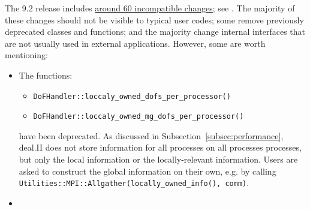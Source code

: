 \documentclass{ansarticle-preprint}
\begin{document}
The 9.2 release includes
\href{https://dealii.org/developer/doxygen/deal.II/changes_between_9_1_1_and_9_2_0.html}
     {around 60 incompatible changes}; see \cite{changes92}. The majority of these changes
should not be visible to typical user codes; some remove previously
deprecated classes and functions; and the majority change internal
interfaces that are not usually used in external
applications. However, some are worth mentioning:
\begin{itemize}
\item The functions:
\begin{itemize}
\item \texttt{DoFHandler::loccaly\_owned\_dofs\_per\_processor()}
\item \texttt{DoFHandler::loccaly\_owned\_mg\_dofs\_per\_processor()}
\end{itemize} have been deprecated. As discussed in Subsection~\ref{subsec:performance}, deal.II does not store information for all processes on all processes processes, but only the local information or the locally-relevant information. Users are asked to construct the global information on their own, e.g. by calling \texttt{Utilities::MPI::Allgather(locally\_owned\_info(), comm)}.
\item 

\end{itemize}
\end{document}
